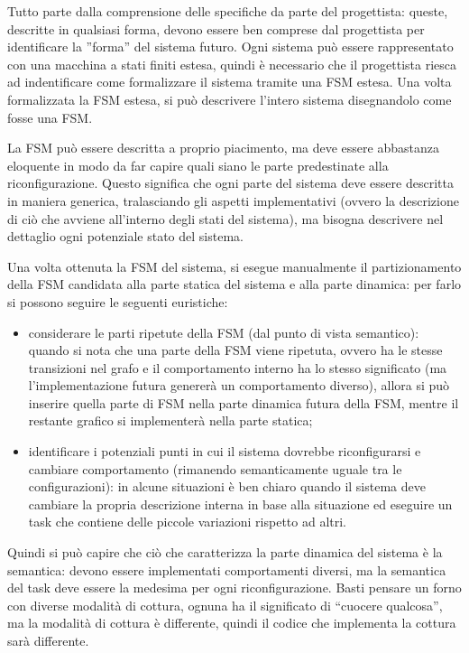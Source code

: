 \documentclass[a4paper,titlepage]{book}
\begin{document}
Tutto parte dalla comprensione delle specifiche da parte del progettista: queste, descritte in qualsiasi forma, devono essere ben comprese dal progettista per identificare la ''forma'' del sistema futuro. Ogni sistema può essere rappresentato con una macchina a stati finiti estesa, quindi è necessario che il progettista riesca ad indentificare come formalizzare il sistema tramite una FSM estesa. Una volta formalizzata la FSM estesa, si può descrivere l'intero sistema disegnandolo come fosse una FSM.

La FSM può essere descritta a proprio piacimento, ma deve essere abbastanza eloquente in modo da far capire quali siano le parte predestinate alla riconfigurazione. Questo significa che ogni parte del sistema deve essere descritta in maniera generica, tralasciando gli aspetti implementativi (ovvero la descrizione di ciò che avviene all'interno degli stati del sistema), ma bisogna descrivere nel dettaglio ogni potenziale stato del sistema. 

Una volta ottenuta la FSM del sistema, si esegue manualmente il partizionamento della FSM candidata alla parte statica del sistema e alla parte dinamica: per farlo si possono seguire le seguenti euristiche:

\begin{itemize}

\item considerare le parti ripetute della FSM (dal punto di vista semantico): quando si nota che una parte della FSM viene ripetuta, ovvero ha le stesse transizioni nel grafo e il comportamento interno ha lo stesso significato (ma l'implementazione futura genererà un comportamento diverso), allora si può inserire quella parte di FSM nella parte dinamica futura della FSM, mentre il restante grafico si implementerà nella parte statica;

 \item identificare i potenziali punti in cui il sistema dovrebbe riconfigurarsi e cambiare comportamento (rimanendo semanticamente uguale tra le configurazioni): in alcune situazioni è ben chiaro quando il sistema deve cambiare la propria descrizione interna in base alla situazione ed eseguire un task che contiene delle piccole variazioni rispetto ad altri. 

\end{itemize}

Quindi si può capire che ciò che caratterizza la parte dinamica del sistema è la semantica: devono essere implementati comportamenti diversi, ma la semantica del task deve essere la medesima per ogni riconfigurazione. Basti pensare un forno con diverse modalità di cottura, ognuna ha il significato di ``cuocere qualcosa'', ma la modalità di cottura è differente, quindi il codice che implementa la cottura sarà differente.
\end{document}
